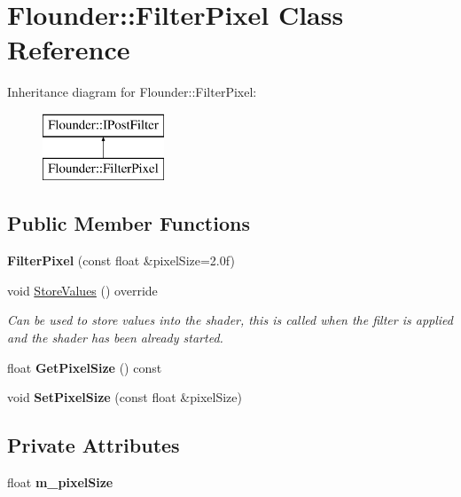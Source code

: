 \hypertarget{class_flounder_1_1_filter_pixel}{}\section{Flounder\+:\+:Filter\+Pixel Class Reference}
\label{class_flounder_1_1_filter_pixel}
Inheritance diagram for Flounder\+:\+:Filter\+Pixel\+:\begin{figure}[H]
\begin{center}
\leavevmode
\includegraphics[height=2.000000cm]{class_flounder_1_1_filter_pixel}
\end{center}
\end{figure}
\subsection*{Public Member Functions}
\begin{DoxyCompactItemize}
\item 
\mbox{\label{class_flounder_1_1_filter_pixel_a2864f3964bca5ffd4ca624932202581e}} 
{\bfseries Filter\+Pixel} (const float \&pixel\+Size=2.\+0f)
\item 
void \hyperlink{class_flounder_1_1_filter_pixel_a284c86691c5919ac56452580e9047658}{Store\+Values} () override
\begin{DoxyCompactList}\small\item\em Can be used to store values into the shader, this is called when the filter is applied and the shader has been already started. \end{DoxyCompactList}\item 
\mbox{\label{class_flounder_1_1_filter_pixel_a97bb19832ec7b7670603acbd75818bc9}} 
float {\bfseries Get\+Pixel\+Size} () const
\item 
\mbox{\label{class_flounder_1_1_filter_pixel_add8a3801d66575e41db4027155fe13ef}} 
void {\bfseries Set\+Pixel\+Size} (const float \&pixel\+Size)
\end{DoxyCompactItemize}
\subsection*{Private Attributes}
\begin{DoxyCompactItemize}
\item 
\mbox{\label{class_flounder_1_1_filter_pixel_a02dad7e4d392a4a6b5ffc7ba7d3f027d}} 
float {\bfseries m\+\_\+pixel\+Size}
\end{DoxyCompactItemize}
